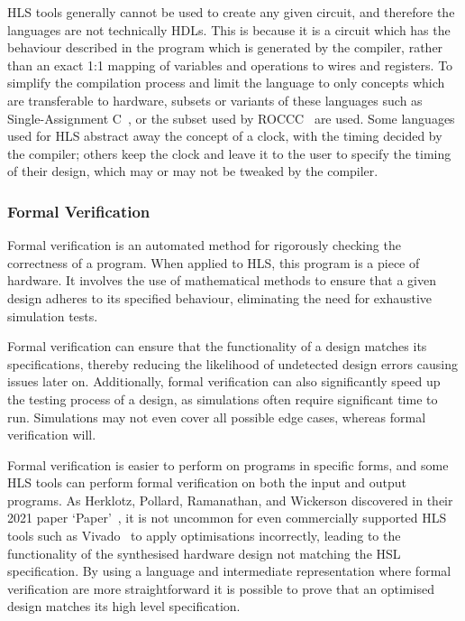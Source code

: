 HLS tools generally cannot be used to create any given circuit, and therefore the languages are not technically HDLs. This is because it is a circuit which has the behaviour described in the program which is generated by the compiler, rather than an exact 1:1 mapping of variables and operations to wires and registers. To simplify the compilation process and limit the language to only concepts which are transferable to hardware, subsets or variants of these languages such as Single-Assignment C \cite{sa-c}, or the subset used by ROCCC \cite{5474060} are used.  Some languages used for HLS abstract away the concept of a clock, with the timing decided by the compiler; others keep the clock and leave it to the user to specify the timing of their design, which may or may not be tweaked by the compiler.

\subsubsection{Formal Verification}\label{formalverif}
Formal verification is an automated method for rigorously checking the correctness of a program. When applied to HLS, this program is a piece of hardware. It involves the use of mathematical methods to ensure that a given design adheres to its specified behaviour, eliminating the need for exhaustive simulation tests.

Formal verification can ensure that the functionality of a design matches its specifications, thereby reducing the likelihood of undetected design errors causing issues later on. Additionally, formal verification can also significantly speed up the testing process of a design, as simulations often require significant time to run. Simulations may not even cover all possible edge cases, whereas formal verification will.

Formal verification is easier to perform on programs in specific forms, and some HLS tools can perform formal verification on both the input and output programs. As Herklotz, Pollard, Ramanathan, and Wickerson discovered in their 2021 paper `Paper' \cite{formal_verif}, it is not uncommon for even commercially supported HLS tools such as Vivado \cite{vivado} to apply optimisations incorrectly, leading to the functionality of the synthesised hardware design not matching the HSL specification. By using a language and intermediate representation where formal verification are more straightforward it is possible to prove that an optimised design matches its high level specification.

